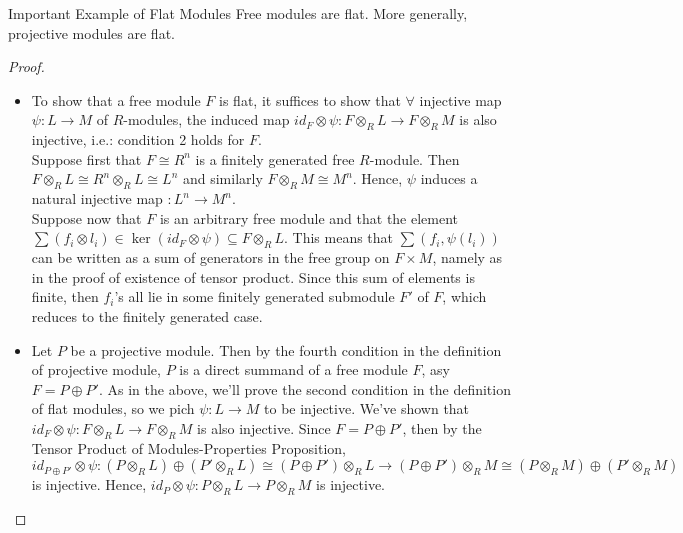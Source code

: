 \begin{proposition}{Important Example of Flat Modules}
Free modules are flat. More generally, projective modules are flat.
\end{proposition}

\begin{proof}
    \begin{itemize}
        \item To show that a free module $F$ is flat, it suffices to show that $\forall$ injective map $\psi: L\to M$ of $R$-modules, the induced map $id_F \otimes \psi: F\otimes_R L \to F\otimes_R M$ is also injective, i.e.: condition 2 holds for $F$.\\
        Suppose first that $F\cong R^n$ is a finitely generated free $R$-module. Then $F\otimes _RL \cong R^n \otimes_R L \cong L^n$ and similarly $F \otimes_R M \cong M^n$. Hence, $\psi$ induces a natural injective map $: L ^n \to M^n$.\\
        Suppose now that $F$ is an arbitrary free module and that the element $\sum (f_i \otimes l_i) \in \ker (id_F \otimes \psi) \subseteq F \otimes_RL$. This means that $\sum(f_i ,\psi(l_i))$ can be written as a sum of generators in the free group on $F \times M$, namely as in the proof of existence of tensor product. Since this sum of elements is finite, then $f_i$'s all lie in some finitely generated submodule $F'$ of $F$, which reduces to the finitely generated case.

        \item Let $P$ be a projective module. Then by the fourth condition in the definition of projective module, $P$ is a direct summand of a free module $F$, asy $F= P\oplus P'$. As in the above, we'll prove the second condition in the definition of flat modules, so we pich $\psi: L\to M$ to be injective. We've shown that $id_F \otimes \psi: F\otimes_R L \to F \otimes_R M$ is also injective. Since $F= P\oplus P'$, then by the Tensor Product of Modules-Properties Proposition, $$id_{P \oplus P'} \otimes \psi: (P \otimes_R L) \oplus (P' \otimes_R L) \cong (P \oplus P') \otimes_R L \to (P \oplus P') \otimes _RM \cong (P \otimes_R M) \oplus (P' \otimes_R M)$$
        is injective. Hence, $id_P \otimes \psi: P \otimes_RL \to P\otimes_R M$ is injective.
    \end{itemize}
\end{proof}

